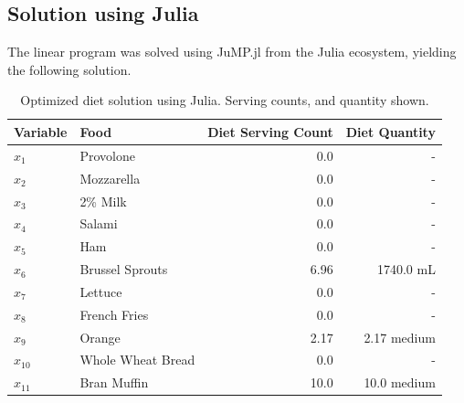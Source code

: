 \documentclass{article}
\begin{document}
    \subsection{Solution using Julia}

    The linear program was solved using JuMP.jl from the Julia ecosystem, yielding the following solution.

    \begin{table}[H]
        \centering
        \begin{tabular}{@{}llrr@{}}
        \toprule
        Variable & Food & Diet Serving Count & Diet Quantity \\ \midrule
        $x_1$    & Provolone         & 0.0  & - \\
        $x_2$    & Mozzarella        & 0.0  & - \\
        $x_3$    & 2\% Milk          & 0.0  & - \\
        $x_4$    & Salami            & 0.0  & - \\
        $x_5$    & Ham               & 0.0  & - \\
        $x_6$    & Brussel Sprouts   & 6.96 & 1740.0 mL \\
        $x_7$    & Lettuce           & 0.0  & - \\
        $x_8$    & French Fries      & 0.0  & - \\
        $x_9$    & Orange            & 2.17 & 2.17 medium \\
        $x_{10}$ & Whole Wheat Bread & 0.0  & - \\
        $x_{11}$ & Bran Muffin       & 10.0 & 10.0 medium \\ \bottomrule
        \end{tabular}
        \caption{Optimized diet solution using Julia. Serving counts, and quantity shown.}
        \label{tab:Q1_Julia_Solution}
    \end{table}
\end{document}
